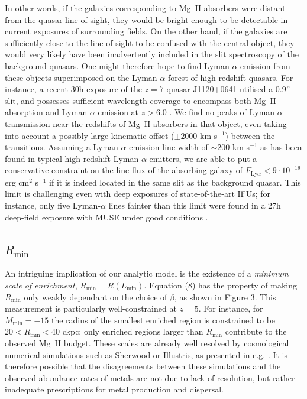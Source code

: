 \documentclass[useAMS,usenatbib]{mn2e}
\newcommand{\lal}{Lyman-$\alpha$ }
\newcommand{\magtwo}{Mg~{\small II} }
\begin{document}
In other words, if the galaxies corresponding to \magtwo absorbers were distant from the quasar line-of-sight, they would be bright enough to be detectable in current exposures of surrounding fields. On the other hand, if the galaxies are sufficiently close to the line of sight to be confused with the central object, they would very likely have been inadvertently included in the slit spectroscopy of the background quasars. One might therefore hope to find \lal emission  from these objects superimposed on the \lal forest of high-redshift quasars. For instance, a recent 30h exposure of the $z=7$ quasar J1120+0641 utilised a 0.9'' slit, and possesses sufficient wavelength coverage to encompass both \magtwo absorption and \lal emission at $z>6.0$ \citep{Bosman17}. We find no peaks of \lal transmission near the redshifts of \magtwo absorbers in that object, even taking into account a possibly large kinematic offset ($\pm 2000$ km s${}^{-1}$) between the transitions. Assuming a \lal emission line width of $\sim 200$ km s${}^{-1}$ as has been found in typical high-redshift \lal emitters, we are able to put a conservative constraint on the line flux of the absorbing galaxy of $F_{\text{Ly}\alpha} < 9 \cdot 10^{-19}$ erg cm${}^2$ s${}^{-1}$ if it is indeed located in the same slit as the background quasar. This limit is challenging even with deep exposures of state-of-the-art IFUs; for instance, only five \lal lines fainter than this limit were found in a 27h deep-field exposure with MUSE under good conditions \citep{Bacon15}.


\subsection{$R_\text{min}$}

An intriguing implication of our analytic model is the existence of a \textit{minimum scale of enrichment}, $R_\text{min} = R(L_\text{min})$. Equation (8) has the property of making $R_\text{min}$ only weakly dependant on the choice of $\beta$, as shown in Figure 3. This measurement is particularly well-constrained at $z=5$. For instance, for $M_\text{min} = -15$ the radius of the smallest enriched region is constrained to be $20 < R_\text{min} < 40$ ckpc; only enriched regions larger than $R_\text{min}$ contribute to the observed \magtwo budget. These scales are already well resolved by cosmological numerical simulations such as Sherwood or Illustris, as presented in e.g. \citet{Keating16}. It is therefore possible that the disagreements between these simulations and the observed abundance rates of metals are not due to lack of resolution, but rather inadequate prescriptions for metal production and dispersal.
\end{document}
